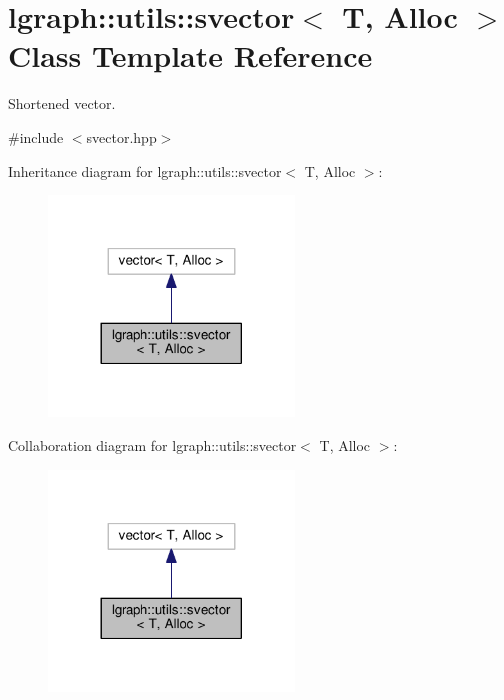 \hypertarget{classlgraph_1_1utils_1_1svector}{}\section{lgraph\+:\+:utils\+:\+:svector$<$ T, Alloc $>$ Class Template Reference}
\label{classlgraph_1_1utils_1_1svector}


Shortened vector.  




{\ttfamily \#include $<$svector.\+hpp$>$}



Inheritance diagram for lgraph\+:\+:utils\+:\+:svector$<$ T, Alloc $>$\+:
\nopagebreak
\begin{figure}[H]
\begin{center}
\leavevmode
\includegraphics[width=185pt]{classlgraph_1_1utils_1_1svector__inherit__graph}
\end{center}
\end{figure}


Collaboration diagram for lgraph\+:\+:utils\+:\+:svector$<$ T, Alloc $>$\+:
\nopagebreak
\begin{figure}[H]
\begin{center}
\leavevmode
\includegraphics[width=185pt]{classlgraph_1_1utils_1_1svector__coll__graph}
\end{center}
\end{figure}
